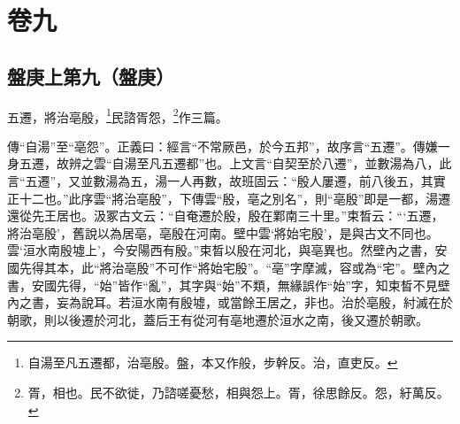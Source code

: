 

\chapter{卷九}


\section{盤庚上第九（盤庚）}


五遷，將治亳殷，\footnote{自湯至凡五遷都，治亳殷。盤，本又作般，步幹反。治，直吏反。}民諮胥怨，\footnote{胥，相也。民不欲徙，乃諮嗟憂愁，相與怨上。胥，徐思餘反。怨，紆萬反。}作三篇。

{\noindent\zhuan{}\fzbyks 傳“自湯”至“亳怨”。正義曰：經言“不常厥邑，於今五邦”，故序言“五遷”。傳嫌一身五遷，故辨之雲“自湯至凡五遷都”也。上文言“自契至於八遷”，並數湯為八，此言“五遷”，又並數湯為五，湯一人再數，故班固云：“殷人屢遷，前八後五，其實正十二也。”此序雲“將治亳殷”，下傳雲“殷，亳之別名”，則“亳殷”即是一都，湯遷還從先王居也。汲冢古文云：“自奄遷於殷，殷在鄴南三十里。”束晳云：“‘五遷，將治亳殷’，舊說以為居亳，亳殷在河南。壁中雲‘將始宅殷’，是與古文不同也。雲‘洹水南殷墟上’，今安陽西有殷。”束晳以殷在河北，與亳異也。然壁內之書，安國先得其本，此“將治亳殷”不可作“將始宅殷”。“亳”字摩滅，容或為“宅”。壁內之書，安國先得，“始”皆作“亂”，其字與“始”不類，無緣誤作“始”字，知束晳不見壁內之書，妄為說耳。若洹水南有殷墟，或當餘王居之，非也。治於亳殷，紂滅在於朝歌，則以後遷於河北，蓋后王有從河有亳地遷於洹水之南，後又遷於朝歌。 \par}

